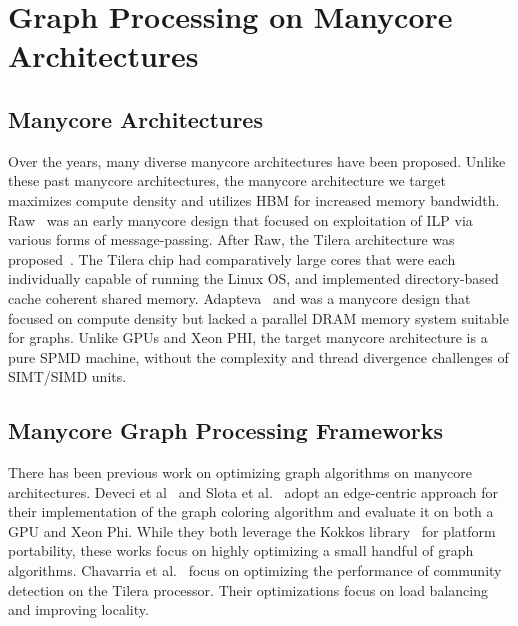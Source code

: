 \section{Graph Processing on Manycore Architectures}
\subsection{Manycore Architectures} Over the years, many diverse manycore architectures have been proposed. Unlike these past manycore architectures, the manycore architecture we target maximizes compute density and utilizes HBM for increased memory bandwidth. Raw~\cite{taylor2004raw} was an early manycore design that focused on exploitation of ILP via various forms of message-passing. 
After Raw, the Tilera architecture was proposed~\cite{ramey2011tilera}.
The Tilera chip had comparatively large cores that were each individually capable of running the Linux OS, and implemented directory-based cache coherent shared memory. 
Adapteva~\cite{gwennap2011adapteva} and \cite{agathos2015parallela} was a manycore design that focused on compute density but lacked a parallel DRAM memory system suitable for graphs. Unlike GPUs and Xeon PHI, the target manycore architecture is a pure SPMD machine, without the complexity and thread divergence challenges of SIMT/SIMD units.

\subsection{Manycore Graph Processing Frameworks} There has been previous work on optimizing graph algorithms on manycore architectures.
Deveci et al~\cite{deveci2016kokkos} and Slota et al.~\cite{slota2015high} adopt an edge-centric approach for their implementation of the graph coloring algorithm and evaluate it on both a GPU and Xeon Phi. 
While they both leverage the Kokkos library~\cite{deveci2016kokkos} for platform portability, these works focus on highly optimizing a small handful of graph algorithms.
Chavarria et al.~\cite{chavarria2014scaling} focus on optimizing the performance of community detection on the Tilera processor.
Their optimizations focus on load balancing and improving locality.

